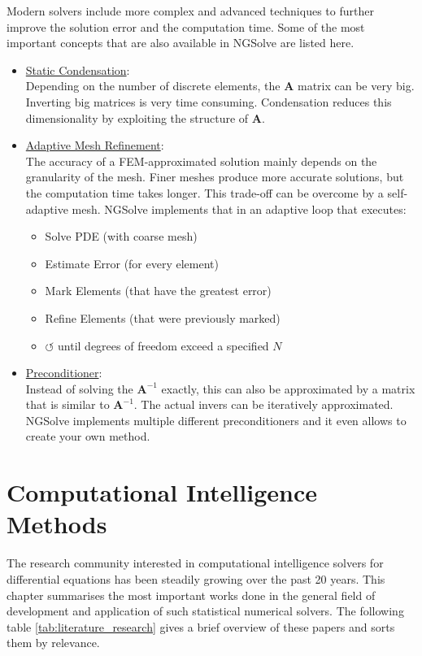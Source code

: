 \documentclass[./\jobname.tex]{subfiles}
\begin{document}
Modern solvers include more complex and advanced techniques to further improve the solution error and the computation time. Some of the most important concepts that are also available in NGSolve are listed here. 

\begin{itemize}
	\item \underline{Static Condensation}: \\
		  Depending on the number of discrete elements, the $\mathbf{A}$ matrix can be very big. Inverting big matrices is very time consuming. Condensation reduces this dimensionality by exploiting the structure of $\mathbf{A}$. 
	\item \underline{Adaptive Mesh Refinement}: \\
		  The accuracy of a FEM-approximated solution mainly depends on the granularity of the mesh. Finer meshes produce more accurate solutions, but the computation time takes longer. This trade-off can be overcome by a self-adaptive mesh. NGSolve implements that in an adaptive loop that executes: 
		  \begin{itemize}
		  	\item Solve PDE (with coarse mesh)
		  	\item Estimate Error (for every element)
		  	\item Mark Elements (that have the greatest error)
		  	\item Refine Elements (that were previously marked)
		  	\item $\circlearrowleft$  until degrees of freedom exceed a specified $N$
		  \end{itemize}
	\item \underline{Preconditioner}: \\
		  Instead of solving the $\mathbf{A}^{-1}$ exactly, this can also be approximated by a matrix that is similar to $\mathbf{A}^{-1}$. The actual invers can be iteratively approximated. NGSolve implements multiple different preconditioners and it even allows to create your own method. 
\end{itemize}


\section{Computational Intelligence Methods} 
\label{chap:literature_overview}

The research community interested in computational intelligence solvers for differential equations has been steadily growing over the past 20 years. This chapter summarises the most important works done in the general field of development and application of such statistical numerical solvers. The following table \ref{tab:literature_research} gives a brief overview of these papers and sorts them by relevance. 
\end{document}
